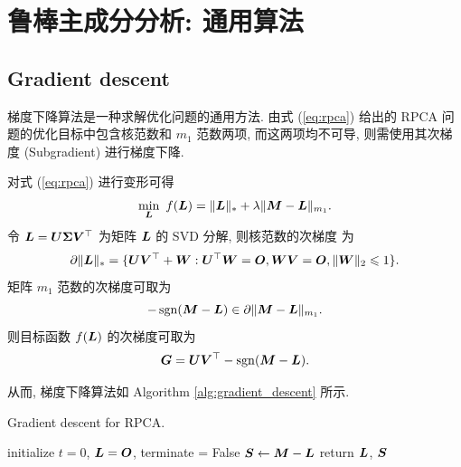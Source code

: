 \documentclass[12pt]{article}
\begin{document}
\section{鲁棒主成分分析: 通用算法}

\subsection{Gradient descent}

梯度下降算法是一种求解优化问题的通用方法. 由式 (\ref{eq:rpca}) 给出的 RPCA 问题的优化目标中包含核范数和 $m_1$ 范数两项, 而这两项均不可导, 则需使用其次梯度 (Subgradient) \cite{boyd2003subgradient} 进行梯度下降. 

对式 (\ref{eq:rpca}) 进行变形可得
\begin{equation}
  \min_{\bm{L}}~f(\bm{L})=\|\bm{L}\|_{*}+\lambda\|\bm{M}-\bm{L}\|_{m_1}.
\end{equation}
令 $\bm{L}=\bm{U}\bm{\Sigma}\bm{V}^\top$ 为矩阵 $\bm{L}$ 的 SVD 分解, 则核范数的次梯度 \cite{watson1992characterization,diadochos2018derivative} 为
\begin{equation}
  \partial\|\bm{L}\|_{*}=\{\bm{U}\bm{V}^\top+\bm{W}:\bm{U}^\top\bm{W}=\bm{O},\bm{W}\bm{V}=\bm{O},\|\bm{W}\|_2\leqslant1\}.
\end{equation}
矩阵 $m_1$ 范数的次梯度可取为
\begin{equation}
  -\operatorname{sgn}(\bm{M}-\bm{L})\in\partial\|\bm{M}-\bm{L}\|_{m_1}.
\end{equation}
则目标函数 $f(\bm{L})$ 的次梯度可取为
\begin{equation}
  \label{eq:subgradient}
  \bm{G}=\bm{U}\bm{V}^\top-\operatorname{sgn}(\bm{M}-\bm{L}).
\end{equation}

从而, 梯度下降算法如 Algorithm \ref{alg:gradient_descent} 所示.
\begin{algorithm}[!htbp]
  \label{alg:gradient_descent}
  \caption{Gradient descent for RPCA.}
  initialize $t=0$, $\bm{L}=\bm{O}$, terminate = False\;
  $\bm{S} \leftarrow \bm{M}-\bm{L}$\;
  return $\bm{L}$, $\bm{S}$\;
\end{algorithm}
\end{document}
